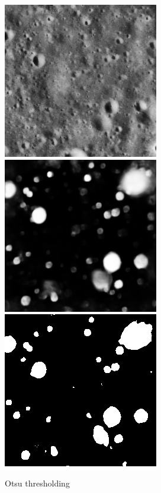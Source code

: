 \documentclass[11pt]{article}
\begin{document}
\begin{figure}[H]
	\includegraphics[width=.3\textwidth]{files/results/26.png}\hfill
	\includegraphics[width=.3\textwidth]{files/results/26_predict.png}\hfill
	\includegraphics[width=.3\textwidth]{files/results/otsu.png}
	\caption{Otsu thresholding}
	\label{otsu thresholding}
\end{figure}
\end{document}
